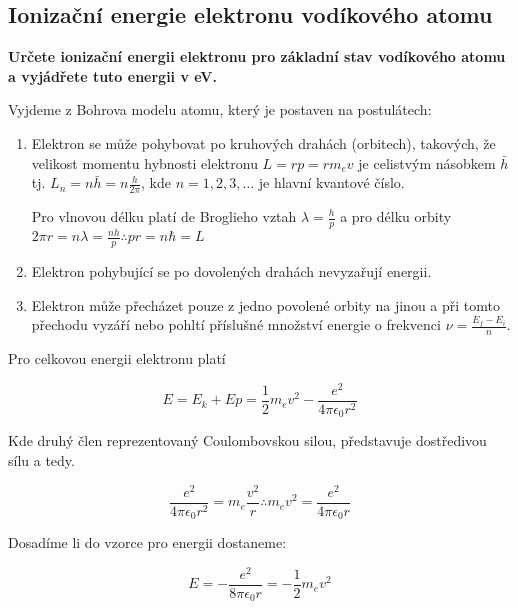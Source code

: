 
\subsection*{Ionizační energie elektronu vodíkového atomu}

\textbf{Určete ionizační energii elektronu pro základní stav vodíkového atomu a vyjádřete tuto energii v eV.}

\vspace{0.5cm}

Vyjdeme z Bohrova modelu atomu, který je postaven na postulátech:
\begin{enumerate}
    \item Elektron se může pohybovat po kruhových drahách (orbitech), takových, že 
    velikost momentu hybnosti elektronu $L = r p = r m_e v$ je celistvým násobkem $\bar h$ tj. $L_n = n \bar h = n\frac{h}{2\pi}$, kde $n = 1, 2, 3, \ldots$ je hlavní kvantové číslo.
    
    \small{Pro vlnovou délku platí de Broglieho vztah $\lambda = \frac{h}{p}$ a pro délku orbity $2\pi r = n \lambda = \frac{nh}{p} \therefore pr = n\hbar = L$}
    
    \item Elektron pohybující se po dovolených drahách nevyzařují energii.
    \item Elektron může přecházet pouze z jedno povolené orbity na jinou a při tomto přechodu vyzáří nebo pohltí příslušné množství energie o frekvenci $\nu  = \frac{E_f - E_i}{n}$. 
\end{enumerate}


Pro celkovou energii elektronu platí

\begin{equation}
    E = E_k + Ep = \frac{1}{2} m_e v^2 - \frac{e^2}{4\pi\epsilon_0 r^2}
\end{equation}

Kde druhý člen reprezentovaný Coulombovskou silou, představuje dostředivou sílu a tedy.

\begin{equation}\label{eq.2}
    \frac{e^2}{4\pi\epsilon_0 r^2} = m_e \frac{v^2}{r} \therefore m_e v^2 = \frac{e^2}{4\pi\epsilon_0 r}
\end{equation}

Dosadíme li do vzorce pro energii dostaneme:

\begin{equation}
    E = -\frac{e^2}{8\pi \epsilon_0 r}  =  -\frac{1}{2} m_e v^2
\end{equation}

